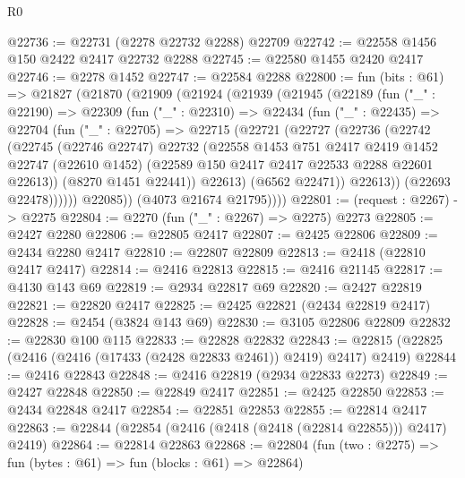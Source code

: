 \begin{lexlean}{R0}
\begin{coremodule}
@22736 := @22731 (@2278 @22732 @2288) @22709
@22742 := @22558 @1456 @150 @2422 @2417 @22732 @2288
@22745 := @22580 @1455 @2420 @2417
@22746 := @2278 @1452
@22747 := @22584 @2288
@22800 := fun (bits : @61) =>
  @21827
    (@21870
      (@21909
        (@21924
          (@21939
            (@21945
              (@22189
                (fun ("_" : @22190) =>
                @22309
                  (fun ("_" : @22310) =>
                  @22434
                    (fun ("_" : @22435) =>
                    @22704
                      (fun ("_" : @22705) =>
                      @22715
                        (@22721
                          (@22727
                            (@22736
                              (@22742
                                (@22745
                                  (@22746 @22747)
                                  @22732
                                  (@22558
                                    @1453
                                    @751
                                    @2417
                                    @2419
                                    @1452
                                    @22747
                                    (@22610 @1452)
                                    (@22589 @150 @2417 @2417 @22533 @2288 @22601 @22613))
                                  (@8270 @1451 @22441))
                                @22613)
                              (@6562 @22471))
                            @22613))
                        (@22693 @22478))))))
              @22085))
          (@4073 @21674 @21795))))
@22801 := (request : @2267) -> @2275
@22804 := @2270 (fun ("_" : @2267) => @2275) @2273
@22805 := @2427 @2280
@22806 := @22805 @2417
@22807 := @2425 @22806
@22809 := @2434 @2280 @2417
@22810 := @22807 @22809
@22813 := @2418 (@22810 @2417 @2417)
@22814 := @2416 @22813
@22815 := @2416 @21145
@22817 := @4130 @143 @69
@22819 := @2934 @22817 @69
@22820 := @2427 @22819
@22821 := @22820 @2417
@22825 := @2425 @22821 (@2434 @22819 @2417)
@22828 := @2454 (@3824 @143 @69)
@22830 := @3105 @22806 @22809
@22832 := @22830 @100 @115
@22833 := @22828 @22832
@22843 := @22815 (@22825 (@2416 (@2416 (@17433 (@2428 @22833 @2461)) @2419) @2417) @2419)
@22844 := @2416 @22843
@22848 := @2416 @22819 (@2934 @22833 @2273)
@22849 := @2427 @22848
@22850 := @22849 @2417
@22851 := @2425 @22850
@22853 := @2434 @22848 @2417
@22854 := @22851 @22853
@22855 := @22814 @2417
@22863 := @22844 (@22854 (@2416 (@2418 (@2418 (@22814 @22855))) @2417) @2419)
@22864 := @22814 @22863
@22868 := @22804 (fun (two : @2275) => fun (bytes : @61) => fun (blocks : @61) => @22864)

\end{coremodule}
\end{lexlean}
